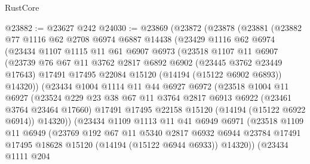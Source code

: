 \begin{lexlean}{RustCore}
\begin{coremodule}
@23882 := @23627 @242
@24030 := @23869
    (@23872
      (@23878
        (@23881
          (@23882
            @77
            @1116
            @62
            @2708
            @6974
            @6887
            @14438
            (@23429
              @1116
              @62
              @6974
              (@23434
                @1107
                @1115
                @11
                @61
                @6907
                @6973
                (@23518
                  @1107
                  @11
                  @6907
                  (@23739
                    @76
                    @67
                    @11
                    @3762
                    @2817
                    @6892
                    @6902
                    (@23445 @3762 @23449 @17643)
                    @17491
                    @17495
                    @22084
                    @15120
                    (@14194 (@15122 @6902 @6893))
                    @14320))
                (@23434
                  @1004
                  @1114
                  @11
                  @44
                  @6927
                  @6972
                  (@23518
                    @1004
                    @11
                    @6927
                    (@23524
                      @229
                      @23
                      @38
                      @67
                      @11
                      @3764
                      @2817
                      @6913
                      @6922
                      (@23461 @3764 @23464 @17660)
                      @17491
                      @17495
                      @22158
                      @15120
                      (@14194 (@15122 @6922 @6914))
                      @14320))
                  (@23434
                    @1109
                    @1113
                    @11
                    @41
                    @6949
                    @6971
                    (@23518
                      @1109
                      @11
                      @6949
                      (@23769
                        @192
                        @67
                        @11
                        @5340
                        @2817
                        @6932
                        @6944
                        @23784
                        @17491
                        @17495
                        @18628
                        @15120
                        (@14194 (@15122 @6944 @6933))
                        @14320))
                    (@23434
                      @1111
                      @204

\end{coremodule}
\end{lexlean}
